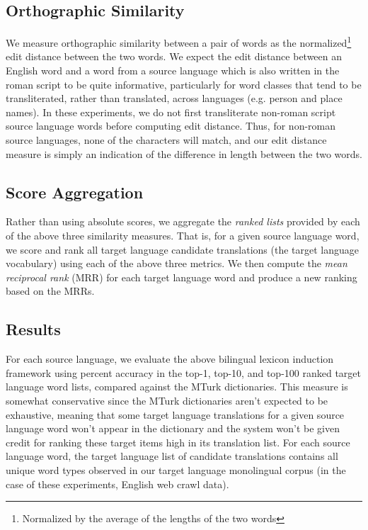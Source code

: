 \documentclass[11pt]{article}
\begin{document}
\subsection{Orthographic Similarity} 
We measure orthographic similarity between a pair of words as the normalized\footnote{Normalized by the average of the lengths of the two words} edit distance between the two words. We expect the edit distance between an English word and a word from a source language which is also written in the roman script to be quite informative, particularly for word classes that tend to be transliterated, rather than translated, across languages (e.g. person and place names). In these experiments, we do not first transliterate non-roman script source language words before computing edit distance. Thus, for non-roman source languages, none of the characters will match, and our edit distance measure is simply an indication of the difference in length between the two words. 

\subsection{Score Aggregation} 
Rather than using absolute scores, we aggregate the {\it ranked lists} provided by each of the above three similarity measures. That is, for a given source language word, we score and rank all target language candidate translations (the target language vocabulary) using each of the above three metrics. We then compute the {\it mean reciprocal rank} (MRR) for each target language word and produce a new ranking based on the MRRs.

\subsection{Results}
For each source language, we evaluate the above bilingual lexicon induction framework using percent accuracy in the top-1, top-10, and top-100 ranked target language word lists, compared against the MTurk dictionaries. This measure is somewhat conservative since the MTurk dictionaries aren't expected to be exhaustive, meaning that some target language translations for a given source language word won't appear in the dictionary and the system won't be given credit for ranking these target items high in its translation list. For each source language word, the target language list of candidate translations contains all unique word types observed in our target language monolingual corpus (in the case of these experiments, English web crawl data). 
\end{document}
